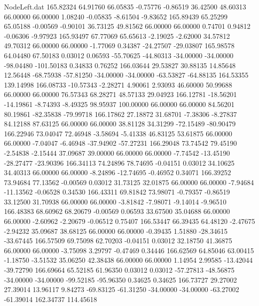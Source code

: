 \begin{filecontents}{NodeLeft.dat}
 165.82324   64.91760   66.05835    -0.75776   -0.86519   36.42500   48.60313   66.00000   66.00000    1.08240   -0.05835   -8.61504   -9.83652
 165.89439   65.25299   65.05188    -0.00569   -0.90101   36.73125   49.81562   66.00000   66.00000    0.74701    0.94812   -0.06306   -9.97923
 165.93497   67.77069   65.65613    -2.19025   -2.62000   34.57812   49.70312   66.00000   66.00000   -1.77069    0.34387  -24.27507  -29.03807
 165.98578   64.04480   67.50183     0.03012    0.06593  -55.70625  -44.80313  -34.00000  -34.00000  -98.04480 -101.50183    0.34833    0.76252
 166.03644   29.53827   30.88135    14.85648   12.56448  -68.75938  -57.81250  -34.00000  -34.00000  -63.53827  -64.88135  164.53355  139.14998
 166.08733  -10.57343   -2.28271     4.90061    2.93093   46.60000   50.99688   66.00000   66.00000   76.57343   68.28271   48.57133   29.04923
 166.12781  -18.56201  -14.19861    -8.74393   -8.49325   98.95937  100.00000   66.00000   66.00000   84.56201   80.19861  -82.35838  -79.99718
 166.17862   27.18872   31.68701    -7.38306   -8.27837   84.12188   87.63125   66.00000   66.00000   38.81128   34.31299  -72.15489  -80.90479
 166.22946   73.04047   72.46948    -3.58694   -5.41338   46.83125   53.61875   66.00000   66.00000   -7.04047   -6.46948  -37.94902  -57.27231
 166.29048   73.74542   79.45190    -2.54838   -2.15444   37.09687   39.00000   66.00000   66.00000   -7.74542  -13.45190  -28.27477  -23.90396
 166.34113   74.24896   78.74695    -0.04151    0.03012   34.10625   34.40313   66.00000   66.00000   -8.24896  -12.74695   -0.46952    0.34071
 166.39252   73.94684   77.13562    -0.00569    0.03012   31.73125   32.01875   66.00000   66.00000   -7.94684  -11.13562   -0.06528    0.34530
 166.43311   69.81842   73.98071    -0.79357   -0.86519   33.12500   31.70938   66.00000   66.00000   -3.81842   -7.98071   -9.14014   -9.96510
 166.48383   68.60962   68.20679    -0.00569    0.06593   33.67500   35.04688   66.00000   66.00000   -2.60962   -2.20679   -0.06512    0.75407
 166.53447   66.39435   64.48120    -2.47675   -2.94232   35.09687   38.68125   66.00000   66.00000   -0.39435    1.51880  -28.34615  -33.67445
 166.57509   69.75098   62.70203    -0.04151    0.03012   32.18750   41.36875   66.00000   66.00000   -3.75098    3.29797   -0.47469    0.34446
 166.62569   64.85046   63.00415    -1.18750   -3.51532   35.06250   42.38438   66.00000   66.00000    1.14954    2.99585  -13.42044  -39.72790
 166.69664   65.52185   61.96350     0.03012    0.03012  -57.27813  -48.56875  -34.00000  -34.00000  -99.52185  -95.96350    0.34625    0.34625
 166.73727   29.27002   27.39014    13.96117    9.84273  -69.83125  -61.31250  -34.00000  -34.00000  -63.27002  -61.39014  162.34737  114.45618

\end{filecontents}
